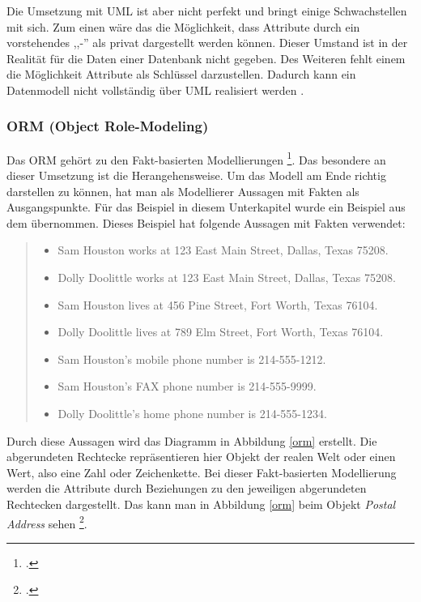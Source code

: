\noindent
Die Umsetzung mit UML ist aber nicht perfekt und bringt einige Schwachstellen mit sich. Zum einen wäre das die Möglichkeit, dass Attribute durch ein vorstehendes ,,-'' als privat dargestellt werden können. Dieser Umstand ist in der Realität für die Daten einer Datenbank nicht gegeben. Des Weiteren fehlt einem die Möglichkeit Attribute als Schlüssel darzustellen. Dadurch kann ein Datenmodell nicht vollständig über UML realisiert werden \footnotemark[7].


\subsubsection{ORM (Object Role-Modeling)}

Das ORM gehört zu den Fakt-basierten Modellierungen \footcite{sqlDataModeling}. Das besondere an dieser Umsetzung ist die Herangehensweise. Um das Modell am Ende richtig darstellen zu können, hat man als Modellierer Aussagen mit Fakten als Ausgangspunkte. Für das Beispiel in diesem Unterkapitel wurde ein Beispiel aus dem  übernommen. Dieses Beispiel hat folgende Aussagen mit Fakten verwendet:
\\
\begin{quote}
\begin{itemize}
	\item Sam Houston works at 123 East Main Street, Dallas, Texas 75208.
	\item Dolly Doolittle works at 123 East Main Street, Dallas, Texas 75208.
	\item Sam Houston lives at 456 Pine Street, Fort Worth, Texas 76104.
	\item Dolly Doolittle lives at 789 Elm Street, Fort Worth, Texas 76104.
	\item Sam Houston’s mobile phone number is 214-555-1212.
	\item Sam Houston’s FAX phone number is 214-555-9999.
	\item Dolly Doolittle’s home phone number is 214-555-1234.
	\\
\end{itemize}
\end{quote}

\noindent
Durch diese Aussagen wird das Diagramm in Abbildung \ref{orm} erstellt. Die abgerundeten Rechtecke repräsentieren hier Objekt der realen Welt oder einen Wert, also eine Zahl oder Zeichenkette. Bei dieser Fakt-basierten Modellierung werden die Attribute durch Beziehungen zu den jeweiligen abgerundeten Rechtecken dargestellt. Das kann man in Abbildung \ref{orm} beim Objekt \textit{Postal Address} sehen \footcite{sqlDataModeling}. 

